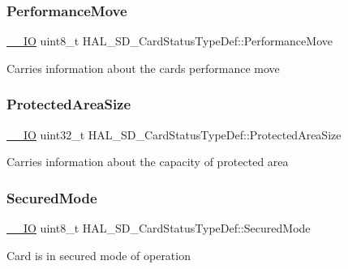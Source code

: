 \subsubsection{\texorpdfstring{PerformanceMove}{PerformanceMove}}
{\footnotesize\ttfamily \mbox{\hyperlink{core__sc300_8h_aec43007d9998a0a0e01faede4133d6be}{\+\_\+\+\_\+\+IO}} uint8\+\_\+t H\+A\+L\+\_\+\+S\+D\+\_\+\+Card\+Status\+Type\+Def\+::\+Performance\+Move}

Carries information about the card\textquotesingle{}s performance move \mbox{\label{struct_h_a_l___s_d___card_status_type_def_aebd64bdfc1886b81784ded596a05a026}} 
\subsubsection{\texorpdfstring{ProtectedAreaSize}{ProtectedAreaSize}}
{\footnotesize\ttfamily \mbox{\hyperlink{core__sc300_8h_aec43007d9998a0a0e01faede4133d6be}{\+\_\+\+\_\+\+IO}} uint32\+\_\+t H\+A\+L\+\_\+\+S\+D\+\_\+\+Card\+Status\+Type\+Def\+::\+Protected\+Area\+Size}

Carries information about the capacity of protected area \mbox{\label{struct_h_a_l___s_d___card_status_type_def_adc5651f507f7706968b93e7aedac8a35}} 
\subsubsection{\texorpdfstring{SecuredMode}{SecuredMode}}
{\footnotesize\ttfamily \mbox{\hyperlink{core__sc300_8h_aec43007d9998a0a0e01faede4133d6be}{\+\_\+\+\_\+\+IO}} uint8\+\_\+t H\+A\+L\+\_\+\+S\+D\+\_\+\+Card\+Status\+Type\+Def\+::\+Secured\+Mode}

Card is in secured mode of operation \mbox{\label{struct_h_a_l___s_d___card_status_type_def_a1f0e2b9742c588e099113d378303c781}} 

